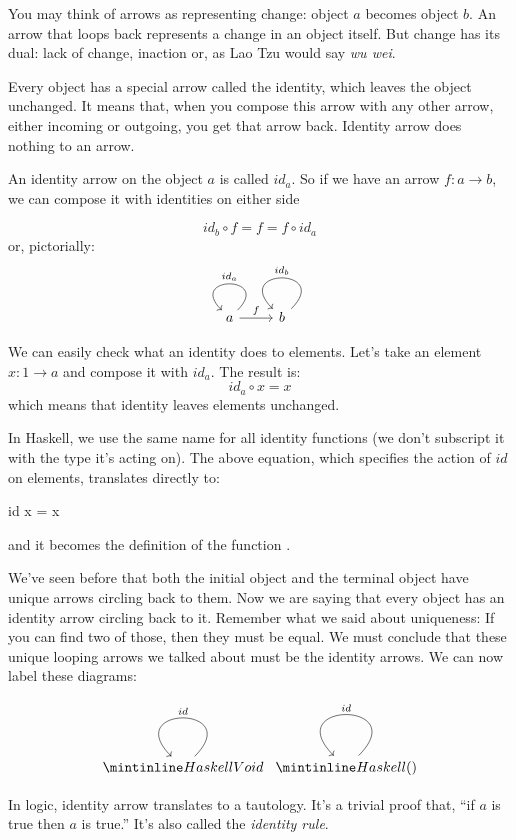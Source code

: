 \documentclass[DaoFP]{subfiles}
\begin{document}
You may think of arrows as representing change: object $a$ becomes object $b$. An arrow that loops back represents a change in an object itself. But change has its dual: lack of change, inaction or, as Lao Tzu would say \emph{wu wei}. 

Every object has a special arrow called the identity, which leaves the object unchanged. It means that, when you compose this arrow with any other arrow, either incoming or outgoing, you get that arrow back. Identity arrow does nothing to an arrow. 

An identity arrow on the object $a$ is called $id_a$. So if we have an arrow $f \colon a \to b$, we can compose it with identities on either side

\[id_b \circ f = f = f \circ id_a \]
or, pictorially:
\[
 \begin{tikzcd}
 a
 \arrow[loop, "id_a"']
 \arrow[r, "f"]
 & b
 \arrow[loop, "id_b"']
 \end{tikzcd}
\]

We can easily check what an identity does to elements. Let's take an element $x \colon 1 \to a$ and compose it with $id_a$. The result is:
\[id_a \circ x = x\]
which means that identity leaves elements unchanged.

In Haskell, we use the same name  for all identity functions (we don't subscript it with the type it's acting on). The above equation, which specifies the action of $id$ on elements, translates directly to:
\begin{haskell}
id x = x
\end{haskell}
and it becomes the definition of the function . 

We've seen before that both the initial object and the terminal object have unique arrows circling back to them. Now we are saying that every object has an identity arrow circling back to it. Remember what we said about uniqueness: If you can find two of those, then they must be equal. We must conclude that these unique looping arrows we talked about must be the identity arrows. We can now label these diagrams:

\[
 \begin{tikzcd}
 \hask{Void}
 \arrow[loop, "id"']
 \end{tikzcd}
 \begin{tikzcd}
 \hask{()}
 \arrow[loop, "id"']
 \end{tikzcd}
\]

In logic, identity arrow translates to a tautology. It's a trivial proof that, ``if $a$ is true then $a$ is true.'' It's also called the \emph{identity rule}.
\end{document}
